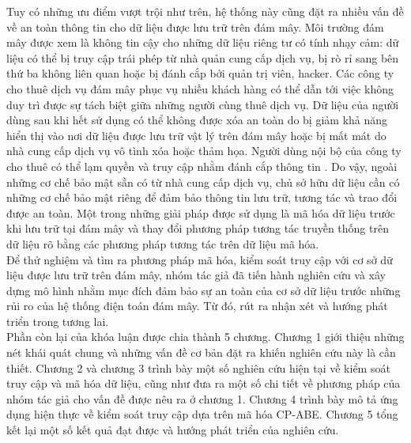 Tuy có những ưu điểm vượt trội như trên, hệ thống này cũng đặt ra nhiều vấn đề
về an toàn thông tin cho dữ liệu được lưu trữ trên đám mây. Môi trường đám mây được
xem là không tin cậy cho những dữ liệu riêng tư có tính nhạy cảm: dữ liệu có thể bị truy
cập trái phép từ nhà quản cung cấp dịch vụ, bị rò rỉ sang bên thứ ba không liên quan hoặc
bị đánh cắp bởi quản trị viên, hacker. Các công ty cho thuê dịch vụ đám mây phục vụ
nhiều khách hàng có thể dẫn tới việc không duy trì được sự tách biệt giữa những người cùng thuê dịch vụ. Dữ liệu của người dùng sau khi hết sử dụng có thể không được xóa an toàn do bị giảm khả năng hiển thị vào nơi dữ liệu được lưu trữ vật lý trên đám mây hoặc bị mất mát do nhà cung cấp dịch vụ vô tình xóa hoặc thảm họa. Người dùng nội bộ của công ty cho thuê có thể lạm quyền và truy cập nhằm đánh cắp thông tin \cite{timothy2018risk}. Do vậy, ngoài những cơ chế bảo mật sẵn có từ nhà cung cấp dịch vụ, chủ sở hữu dữ liệu cần có những cơ chế bảo mật riêng để đảm bảo thông tin lưu trữ, tương tác và trao đổi được an toàn. Một trong những giải pháp được sử dụng là mã hóa dữ liệu trước khi lưu trữ tại đám mây và thay đổi phương pháp tương tác truyền thống trên dữ liệu rõ bằng các phương pháp tương tác trên dữ liệu mã hóa. \\ 

Để thử nghiệm và tìm ra phương pháp mã hóa, kiểm soát truy cập với cơ sở dữ liệu được lưu trữ trên đám mây, nhóm tác giả đã tiến hành nghiên cứu và xây dựng mô hình nhằm mục đích đảm bảo sự an toàn của cơ sở dữ liệu trước những rủi ro của hệ thống điện toán đám mây. Từ đó, rút ra nhận xét và hướng phát triển trong tương lai. \\

Phần còn lại của khóa luận được chia thành 5 chương. Chương 1 giới thiệu những nét khái quát chung và những vấn đề cơ bản đặt ra khiến nghiên cứu này là cần thiết. Chương 2 và chương 3 trình bày một số nghiên cứu hiện tại về kiểm soát truy cập và mã hóa dữ liệu, cũng như đưa ra một số chi tiết về phương pháp của nhóm tác giả cho vấn đề được nêu ra ở chương 1. Chương 4 trình bày mô tả ứng dụng hiện thực về kiểm soát truy cập dựa trên mã hóa CP-ABE. Chương 5 tổng kết lại một số kết quả đạt được và hướng phát triển của nghiên cứu.

